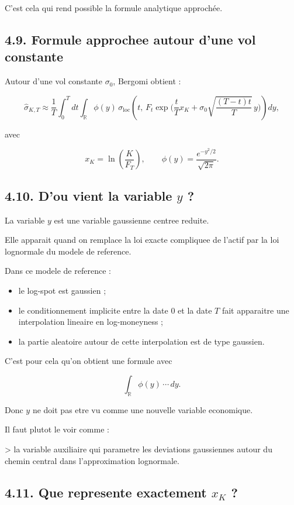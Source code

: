 \documentclass[11pt,a4paper]{article}
\begin{document}
C'est cela qui rend possible la formule analytique approchée.

\subsection{4.9. Formule approchee autour d'une vol constante}

Autour d'une vol constante \(\sigma_0\), Bergomi obtient :

\[
\widehat{\sigma}_{K,T}
\approx
\frac{1}{T}
\int_0^T dt
\int_{\mathbb R}\phi(y)\,
\sigma_{\mathrm{loc}}\!\left(
t,\,
F_t\exp\!\Big(
\frac{t}{T}x_K+\sigma_0\sqrt{\frac{(T-t)t}{T}}\,y
\Big)
\right)dy,
\]

avec

\[
x_K=\ln\!\left(\frac{K}{F_T}\right),
\qquad
\phi(y)=\frac{e^{-y^2/2}}{\sqrt{2\pi}}.
\]

\subsection{4.10. D'ou vient la variable \(y\) ?}

La variable \(y\) est une variable gaussienne centree reduite.

Elle apparait quand on remplace la loi exacte compliquee de l'actif par la loi lognormale du modele de reference.

Dans ce modele de reference :

\begin{itemize}
\item le log-spot est gaussien ;
\item le conditionnement implicite entre la date \(0\) et la date \(T\) fait apparaitre une interpolation lineaire en log-moneyness ;
\item la partie aleatoire autour de cette interpolation est de type gaussien.
\end{itemize}

C'est pour cela qu'on obtient une formule avec

\[
\int_{\mathbb R}\phi(y)\,\cdots\,dy.
\]

Donc \(y\) ne doit pas etre vu comme une nouvelle variable economique.

Il faut plutot le voir comme :

> la variable auxiliaire qui parametre les deviations gaussiennes autour du chemin central dans l'approximation lognormale.

\subsection{4.11. Que represente exactement \(x_K\) ?}
\end{document}
